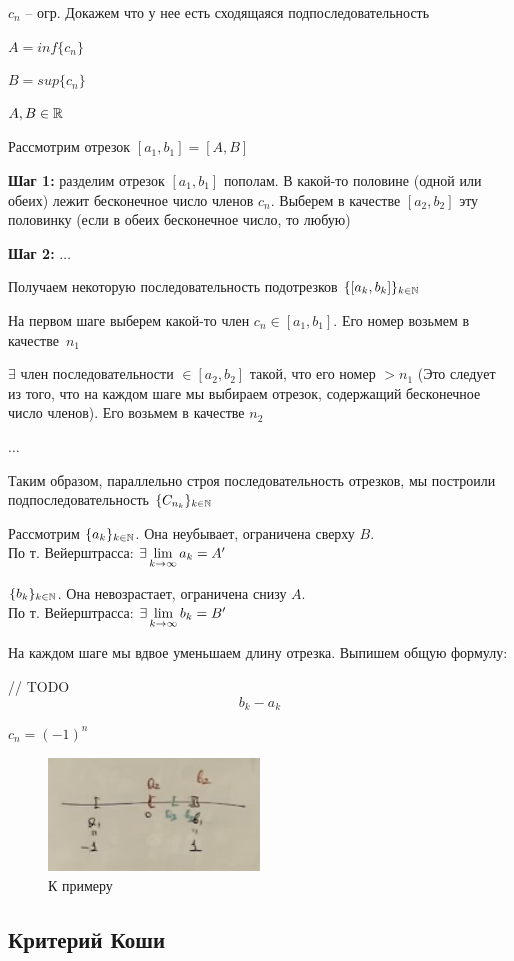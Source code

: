 \begin{Proof}
    $c_n$ -- огр. Докажем что у нее есть сходящаяся подпоследовательность

    $A = inf\{c_n\}$
    
    $B = sup\{c_n\}$

    $A, B \in \mathbb{R}$

    Рассмотрим отрезок $[a_1,b_1] = [A,B]$

    \textbf{Шаг 1:} разделим отрезок $[a_1,b_1]$ пополам. В какой-то половине (одной или обеих) лежит бесконечное число членов $c_n$. Выберем в качестве $[a_2,b_2]$ эту половинку (если в обеих бесконечное число, то любую)

    \textbf{Шаг 2:} $\ldots$

    Получаем некоторую последовательность подотрезков $\{[a_k,b_k]\}_{k \in \mathbb{N}}$

    На первом шаге выберем какой-то член $c_n \in [a_1,b_1]$. Его номер возьмем в качестве~$n_1$

    $\exists$ член последовательности $\in [a_2,b_2]$ такой, что его номер $> n_1$ (Это следует из того, что на каждом шаге мы выбираем отрезок, содержащий бесконечное число членов). Его возьмем в качестве $n_2$

    $\ldots$

    Таким образом, параллельно строя последовательность отрезков, мы построили подпоследовательность $\{C_{n_k}\}_{k\in\mathbb{N}}$

    Рассмотрим $\{a_k\}_{k\in\mathbb{N}}$. Она неубывает, ограничена сверху $B$. \\По т. Вейерштрасса: $\exists \lim\limits_{k \to \infty} a_k = A'$

    $\{b_k\}_{k\in\mathbb{N}}$. Она невозрастает, ограничена снизу $A$. \\По т. Вейерштрасса: $\exists \lim\limits_{k \to \infty} b_k = B'$

    На каждом шаге мы вдвое уменьшаем длину отрезка. Выпишем общую формулу:
    
    // TODO
    $$ b_k - a_k $$
\end{Proof}

\begin{example}
    $c_n = (-1)^n$
\end{example}

\begin{figure}[h]
\centering
\includegraphics[width=0.5\textwidth]{lectures/files/lec6-21-17-51.png}
\caption{К примеру}
\label{fig:lec6-21-17-51.png}
\end{figure}

\subsection{Критерий Коши}
